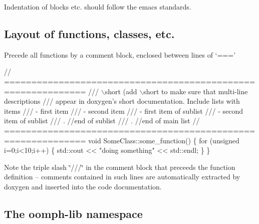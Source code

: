 \begin{DoxyItemize}
\item Indentation of blocks etc. should follow the emacs standards.
\end{DoxyItemize}\hypertarget{index_layout_functions_etc}{}\subsection{Layout of functions, classes, etc.}\label{index_layout_functions_etc}

\begin{DoxyItemize}
\item Precede all functions by a comment block, enclosed between lines of `===' 
\begin{DoxyCode}
\textcolor{comment}{// =============================================================}\textcolor{comment}{}
\textcolor{comment}{/// \(\backslash\)short (add \(\backslash\)short to make sure that multi-line descriptions}
\textcolor{comment}{/// appear in doxygen's short documentation. Include lists with items}
\textcolor{comment}{/// - first item}
\textcolor{comment}{/// - second item}
\textcolor{comment}{///   - first item of sublist}
\textcolor{comment}{///   - second item of sublist}
\textcolor{comment}{///   . //end of sublist}
\textcolor{comment}{/// . //end of main list}
\textcolor{comment}{}\textcolor{comment}{// =============================================================}
\textcolor{keywordtype}{void} SomeClass::some\_function()
\{
 \textcolor{keywordflow}{for} (\textcolor{keywordtype}{unsigned} i=0;i<10;i++)
  \{
   std::cout << \textcolor{stringliteral}{"doing something"} << std::endl;
  \}
 \}
\end{DoxyCode}
 Note the triple slash \char`\"{}///\char`\"{} in the comment block that preceeds the function definition -- comments contained in such lines are automatically extracted by doxygen and inserted into the code documentation.
\end{DoxyItemize}\hypertarget{index_oomph}{}\subsection{The oomph-\/lib namespace}\label{index_oomph}

